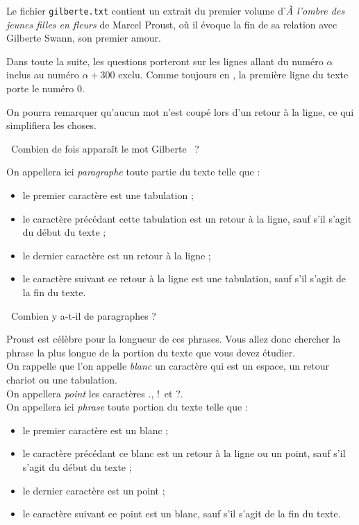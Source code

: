 
Le fichier \texttt{gilberte.txt} contient un extrait du premier volume d'\emph{À l'ombre des jeunes filles 
en fleurs} de Marcel Proust, où il évoque la fin de sa relation avec Gilberte Swann, son 
premier amour.

Dans toute la suite, les questions porteront sur les lignes allant du numéro $\alpha$ inclus au 
numéro $\alpha+300$ exclu. Comme toujours en \python, la première ligne du texte porte le numéro 
0.

On pourra remarquer qu'aucun mot n'est coupé lors d'un retour à la ligne, ce qui simplifiera les 
choses.

\question\ Combien de fois apparaît le mot \og Gilberte \fg\ ?

\vspace{1cm}

\noindent On appellera ici \emph{paragraphe} toute partie du texte telle que :
\begin{itemize}
 \item le premier caractère est une tabulation ;
\item le caractère précédant cette tabulation est un retour à la  ligne, sauf s'il s'agit du début 
du texte ; 
\item le dernier caractère est un retour à la ligne ;
\item le caractère suivant ce retour à la ligne est une tabulation, sauf s'il s'agit de la fin du 
texte.
\end{itemize}

\question\ Combien y a-t-il de paragraphes ?



\noindent Proust est célèbre pour la longueur de ces phrases. Vous allez donc chercher la phrase la plus 
longue de la portion du texte que vous devez étudier.\\
On rappelle que l'on appelle \emph{blanc} un caractère qui est un espace, un retour chariot ou une 
tabulation.\\
On appellera \emph{point} les caractères \og.\fg, \og!\fg\ et \og?\fg. \\
On appellera ici \emph{phrase} toute portion du texte telle que :
\begin{itemize}
 \item le premier caractère est un blanc ;
 \item le caractère précédant ce blanc est un retour à la ligne ou un point, sauf s'il s'agit du 
début du texte ;
 \item le dernier caractère est un point ;
 \item le caractère suivant ce point est un blanc, sauf s'il s'agit de la fin du texte.
\end{itemize}

